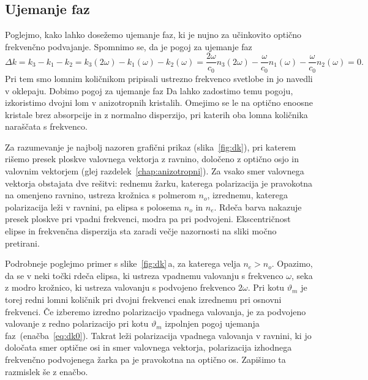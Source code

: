 \subsection*{Ujemanje faz}
Poglejmo, kako lahko dosežemo ujemanje faz, ki je nujno za učinkovito optično
frekvenčno podvajanje. Spomnimo se, da je pogoj za ujemanje faz 
\begin{equation}
\Delta k = k_3 - k_1 -k_2 = k_3(2\omega) - k_1(\omega) -k_2(\omega) = 
\frac{2\omega}{c_0} n_3(2\omega) - \frac{\omega}{c_0} n_1(\omega)- \frac{\omega}{c_0} n_2(\omega) =0.
\end{equation}
Pri tem smo lomnim količnikom pripisali ustrezno frekvenco svetlobe in jo navedli v oklepaju. Dobimo
pogoj za ujemanje faz 
Da lahko zadostimo temu pogoju, izkoristimo dvojni lom v 
anizotropnih kristalih. Omejimo se le na optično 
enoosne kristale brez absorpcije in z 
normalno disperzijo, pri katerih oba lomna količnika naraščata s frekvenco.  

Za razumevanje je najbolj nazoren grafični prikaz (slika~\ref{fig:dk}), pri katerem
rišemo presek ploskve valovnega vektorja z ravnino, določeno z optično osjo in valovnim
vektorjem (glej razdelek~\ref{chap:anizotropni}). 
Za vsako smer valovnega vektorja obstajata dve rešitvi:
rednemu žarku, katerega polarizacija je pravokotna na omenjeno ravnino,
ustreza krožnica s polmerom $n_o$, izrednemu, katerega polarizacija leži v ravnini, 
pa elipsa s polosema $n_o$ in $n_e$. 
Rdeča barva nakazuje presek ploskve pri vpadni frekvenci, modra pa pri podvojeni. 
Ekscentričnost elipse in frekvenčna disperzija sta zaradi večje nazornosti na sliki 
močno pretirani. 

Podrobneje poglejmo primer s slike~\ref{fig:dk}\,a, za katerega velja $n_e>n_o$. 
Opazimo, da se v neki točki rdeča elipsa, ki ustreza vpadnemu valovanju s frekvenco $\omega$, 
seka z modro krožnico, ki ustreza valovanju s podvojeno frekvenco $2\omega$. Pri kotu 
$\vartheta_m$ je torej redni lomni 
količnik pri dvojni frekvenci enak izrednemu pri osnovni
frekvenci. Če izberemo izredno polarizacijo vpadnega valovanja, je za podvojeno 
valovanje z redno polarizacijo pri kotu $\vartheta_m$ izpolnjen pogoj ujemanja 
faz~(enačba~\ref{eq:dk0}). Takrat leži polarizacija vpadnega valovanja v ravnini,
ki jo določata smer optične osi in smer valovnega vektorja, polarizacija 
izhodnega frekvenčno podvojenega žarka pa 
je pravokotna na optično os. Zapišimo ta razmislek še z enačbo.

